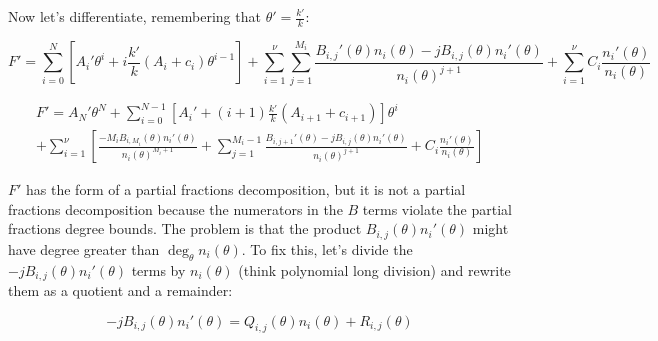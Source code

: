 Now let's differentiate, remembering that $\theta' = \frac{k'}{k}$:

$$F' = \sum_{i=0}^N \left[ A_i' \theta^i + i \frac{k'}{k} (A_i + c_i) \theta^{i-1} \right]
+ \sum_{i=1}^\nu \sum_{j=1}^{M_i} \frac{B_{i,j}'(\theta) n_i(\theta) - j B_{i,j}(\theta) n_i'(\theta)}{n_i(\theta)^{j+1}}
  + \sum_{i=1}^\nu C_i \frac{n_i'(\theta)}{n_i(\theta)}$$

\begin{comment}
$$F' = A_0' + \sum_{i=1}^N ( A_i' \theta^i + i \frac{k'}{k} (A_i + c_i) \theta^{i-1} )
+ \sum_{i=1}^\nu \sum_{j=1}^{M_i} \frac{B_{i,j}'(\theta) n_i(\theta) - j B_{i,j}(\theta) n_i'(\theta)}{n_i(\theta)^{j+1}}
  + \sum_{i=1}^\nu C_i \frac{n_i'(\theta)}{n_i(\theta)}$$
\end{comment}

\begin{comment}
\begin{multline*}
F' = \sum_{i=0}^{N-1} \left[ A_i' + (i+1) \frac{k'}{k} A_{i+1} \right] \theta^{i} + A_N' \theta^N \\
+ \sum_{i=1}^\nu \sum_{j=1}^{M_i} \frac{B_{i,j}'(\theta) n_i(\theta) - j B_{i,j}(\theta) n_i'(\theta)}{n_i(\theta)^{j+1}}
  + \sum_{i=1}^\nu C_i \frac{n_i'(\theta)}{n_i(\theta)}
\end{multline*}
\end{comment}

\begin{multline*}
F' = A_N' \theta^N + \sum_{i=0}^{N-1} \left[ A_i' + (i+1) \frac{k'}{k} (A_{i+1} + c_{i+1}) \right] \theta^{i} \\
+ \sum_{i=1}^\nu \left[ \frac{- M_i B_{i,M_i}(\theta) n_i'(\theta)}{n_i(\theta)^{M_i+1}} + \sum_{j=1}^{M_i-1} \frac{B_{i,j+1}'(\theta) - j B_{i,j}(\theta) n_i'(\theta)}{n_i(\theta)^{j+1}}
  + C_i \frac{n_i'(\theta)}{n_i(\theta)} \right]
\end{multline*}

$F'$ has the form of a partial fractions decomposition, but it is not
a partial fractions decomposition because the numerators in the $B$
terms violate the partial fractions degree bounds.  The problem
is that the product $B_{i,j}(\theta) n_i'(\theta)$ might
have degree greater than $\deg_\theta n_i(\theta)$.
To fix this, let's
divide the $-jB_{i,j}(\theta)n_i'(\theta)$ terms by $n_i(\theta)$
(think polynomial long division) and rewrite them as a quotient
and a remainder:

$$ - j B_{i,j}(\theta) n_i'(\theta) = Q_{i,j}(\theta) n_i(\theta) + R_{i,j}(\theta)$$

